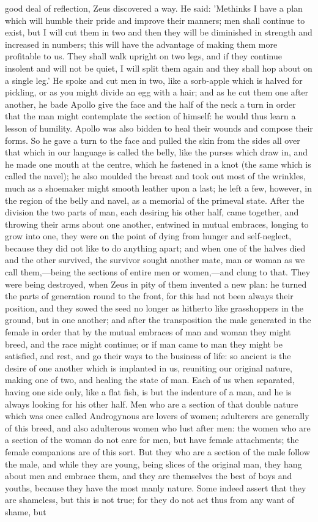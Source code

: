 \documentclass[11pt,letter]{article}
\begin{document}
good deal of reflection, Zeus discovered a way. He said: 'Methinks I have a plan which will humble their pride and improve their manners; men shall continue to exist, but I will cut them in two and then they will be diminished in strength and increased in numbers; this will have the advantage of making them more profitable to us. They shall walk upright on two legs, and if they continue insolent and will not be quiet, I will split them again and they shall hop about on a single leg.' He spoke and cut men in two, like a sorb-apple which is halved for pickling, or as you might divide an egg with a hair; and as he cut them one after another, he bade Apollo give the face and the half of the neck a turn in order that the man might contemplate the section of himself: he would thus learn a lesson of humility. Apollo was also bidden to heal their wounds and compose their forms. So he gave a turn to the face and pulled the skin from the sides all over that which in our language is called the belly, like the purses which draw in, and he made one mouth at the centre, which he fastened in a knot (the same which is called the navel); he also moulded the breast and took out most of the wrinkles, much as a shoemaker might smooth leather upon a last; he left a few, however, in the region of the belly and navel, as a memorial of the primeval state. After the division the two parts of man, each desiring his other half, came together, and throwing their arms about one another, entwined in mutual embraces, longing to grow into one, they were on the point of dying from hunger and self-neglect, because they did not like to do anything apart; and when one of the halves died and the other survived, the survivor sought another mate, man or woman as we call them,—being the sections of entire men or women,—and clung to that. They were being destroyed, when Zeus in pity of them invented a new plan: he turned the parts of generation round to the front, for this had not been always their position, and they sowed the seed no longer as hitherto like grasshoppers in the ground, but in one another; and after the transposition the male generated in the female in order that by the mutual embraces of man and woman they might breed, and the race might continue; or if man came to man they might be satisfied, and rest, and go their ways to the business of life: so ancient is the desire of one another which is implanted in us, reuniting our original nature, making one of two, and healing the state of man. Each of us when separated, having one side only, like a flat fish, is but the indenture of a man, and he is always looking for his other half. Men who are a section of that double nature which was once called Androgynous are lovers of women; adulterers are generally of this breed, and also adulterous women who lust after men: the women who are a section of the woman do not care for men, but have female attachments; the female companions are of this sort. But they who are a section of the male follow the male, and while they are young, being slices of the original man, they hang about men and embrace them, and they are themselves the best of boys and youths, because they have the most manly nature. Some indeed assert that they are shameless, but this is not true; for they do not act thus from any want of shame, but 
\end{document}
